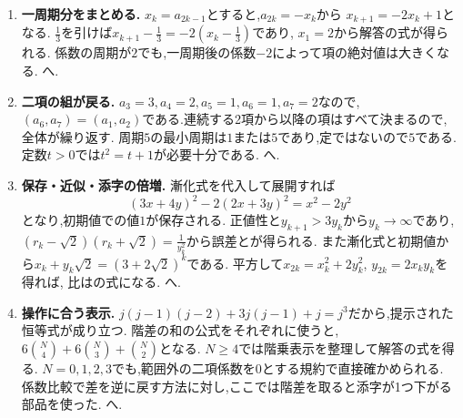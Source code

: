 \begin{enumerate}[label=\textbf{問\arabic*.},format=\bookitemlink{practice-connections}{solution}{problem}]
  \item \textbf{一周期分をまとめる.}
    $x_k=a_{2k-1}$とすると,$a_{2k}=-x_k$から
    $x_{k+1}=-2x_k+1$となる.
    $\frac{1}{3}$を引けば$x_{k+1}-\frac{1}{3}=-2\left(x_k-\frac{1}{3}\right)$であり,
    $x_1=2$から解答の式が得られる.
    係数の周期が$2$でも,一周期後の係数$-2$によって項の絶対値は大きくなる.
    へ.
  \item \textbf{二項の組が戻る.}
    $a_3=3,a_4=2,a_5=1,a_6=1,a_7=2$なので,
    $(a_6,a_7)=(a_1,a_2)$である.連続する2項から以降の項はすべて決まるので,全体が繰り返す.
    周期$5$の最小周期は$1$または$5$であり,定ではないので$5$である.
    定数$t>0$では$t^2=t+1$が必要十分である.
    へ.
  \item \textbf{保存・近似・添字の倍増.}
    漸化式を代入して展開すれば
    \[
      (3x+4y)^2-2(2x+3y)^2=x^2-2y^2
    \]
    となり,初期値での値$1$が保存される.
    正値性と$y_{k+1}>3y_k$から$y_k\to\infty$であり,
    $(r_k-\sqrt2)(r_k+\sqrt2)=\frac{1}{y_k^2}$から誤差とが得られる.
    また漸化式と初期値から$x_k+y_k\sqrt2=(3+2\sqrt2)^k$である.
    平方して$x_{2k}=x_k^2+2y_k^2$, $y_{2k}=2x_ky_k$を得れば,
    比はの式になる.
    へ.
  \item \textbf{操作に合う表示.}
    $j(j-1)(j-2)+3j(j-1)+j=j^3$だから,提示された恒等式が成り立つ.
    階差の和の公式をそれぞれに使うと,
    $6\binom N4+6\binom N3+\binom N2$となる.
    $N\ge4$では階乗表示を整理して解答の式を得る.
    $N=0,1,2,3$でも,範囲外の二項係数を0とする規約で直接確かめられる.
    係数比較で差を逆に戻す方法に対し,ここでは階差を取ると添字が1つ下がる部品を使った.
    へ.
\end{enumerate}
